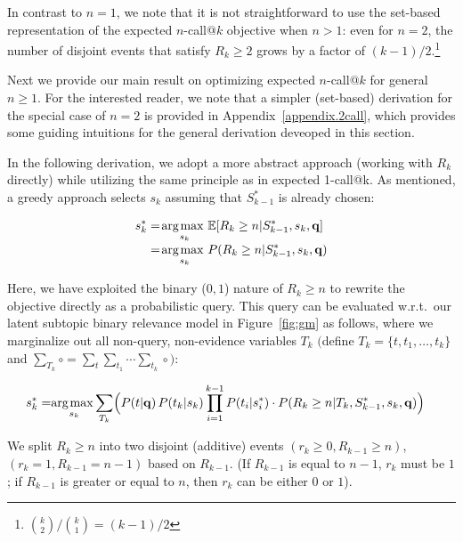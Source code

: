 In contrast to $n=1$, we note that it is not straightforward to use the set-based
representation of the expected $n$-call@$k$ objective when $n > 1$: even
for $n=2$, the number of disjoint events that satisfy $R_k \geq 2$
grows by a factor of $(k-1)/2$.\footnote{$\binom{k}{2} / \binom{k}{1}
  = (k-1)/2$}

Next we provide our main result on optimizing expected $n$-call@$k$
for general $n \geq 1$.  For the interested reader, we note that a
simpler (set-based) derivation for the special case of $n=2$ is
provided in Appendix~\ref{appendix.2call}, which provides some guiding
intuitions for the general derivation deveoped in this section.
 
In the following derivation, we adopt a more abstract approach (working with $R_k$ directly) while utilizing the same principle as in expected 1-call@k.
As mentioned, a greedy approach selects $s_k$ assuming that $S_{k-1}^*$ is already chosen:

\begin{align}
  s_k^* & = \argmax_{s_k} \mathbb{E}[R_k\geq n|S_{k-1}^*,s_k,\vec{q}] \nonumber\\[-1mm]
  & = \argmax_{s_k} P(R_k\geq n|S_{k-1}^*,s_k,\vec{q}) \nonumber 
\end{align}

Here, we have exploited the binary ($0,1$) nature of $R_k \geq n$ to rewrite the objective
directly as a probabilistic query.
This query can be evaluated w.r.t.\ our latent subtopic binary relevance
model in Figure~\ref{fig:gm} as follows, where we marginalize out
all non-query, non-evidence variables $T_k$ $\big($define
$T_k\!=\!\{t,t_1,\dots,t_k\}$ and 
$\sum_{T_k} \circ = \sum_t \sum_{t_1} \cdots \sum_{t_k} \circ \big)$:

\begin{align}
  s_k^* = & \argmax_{s_k} \!\sum_{T_k} \Bigl( P(t|\vec{q}) \,P(t_k|s_k) \prod_{i=1}^{k-1} P(t_i|s_i^*) \cdot P(R_k\geq n|T_k,S_{k-1}^*,s_k,\vec{q}) \Bigr) \nonumber 
\end{align}

We split $R_k \geq n$ into two disjoint (additive) events
$(r_k \! \geq \! 0, R_{k\!-\!1}\!\geq \!n)$, $(r_k\!\!=\!\!1, R_{k\!-\!1}\!\!=\!\!n\!-\!1)$ based on $R_{k-1}$. (If $R_{k-1}$ is equal to $n\!-\!1$, $r_k$ must be $1$; if $R_{k-1}$ is greater or equal to $n$, then $r_k$ can be either $0$ or $1$). 


